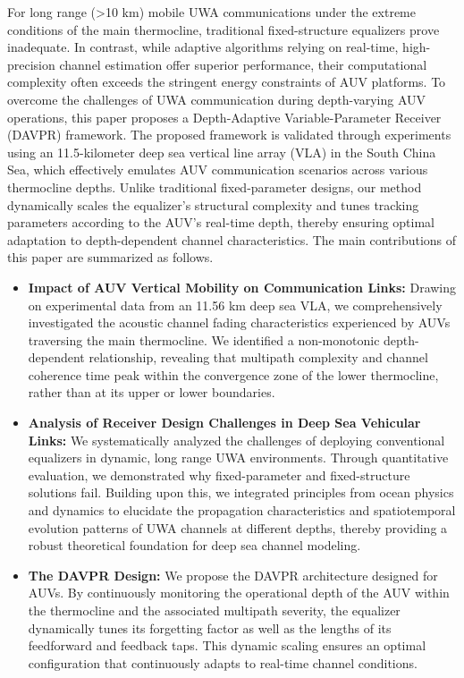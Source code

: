 \documentclass[lettersize,journal]{IEEEtran}
\begin{document}
For long range (\textgreater 10 km) mobile UWA communications under the extreme conditions of the main thermocline, traditional fixed-structure equalizers prove inadequate. In contrast, while adaptive algorithms relying on real-time, high-precision channel estimation offer superior performance, their computational complexity often exceeds the stringent energy constraints of AUV platforms. To overcome the challenges of UWA communication during depth-varying AUV operations, this paper proposes a Depth-Adaptive Variable-Parameter Receiver (DAVPR) framework. The proposed framework is validated through experiments using an 11.5-kilometer deep sea vertical line array (VLA) in the South China Sea, which effectively emulates AUV communication scenarios across various thermocline depths. Unlike traditional fixed-parameter designs, our method dynamically scales the equalizer's structural complexity and tunes tracking parameters according to the AUV’s real-time depth, thereby ensuring optimal adaptation to depth-dependent channel characteristics. The main contributions of this paper are summarized as follows.
\begin{itemize}
\item \textbf{Impact of AUV Vertical Mobility on Communication Links:} Drawing on experimental data from an 11.56 km deep sea VLA, we comprehensively investigated the acoustic channel fading characteristics experienced by AUVs traversing the main thermocline. We identified a non-monotonic depth-dependent relationship, revealing that multipath complexity and channel coherence time peak within the convergence zone of the lower thermocline, rather than at its upper or lower boundaries.
\item \textbf{Analysis of Receiver Design Challenges in Deep Sea Vehicular Links:} We systematically analyzed the challenges of deploying conventional equalizers in dynamic, long range UWA environments. Through quantitative evaluation, we demonstrated why fixed-parameter and fixed-structure solutions fail. Building upon this, we integrated principles from ocean physics and dynamics to elucidate the propagation characteristics and spatiotemporal evolution patterns of UWA channels at different depths, thereby providing a robust theoretical foundation for deep sea channel modeling.
\item \textbf{The DAVPR Design:} We propose the DAVPR architecture designed for AUVs. By continuously monitoring the operational depth of the AUV within the thermocline and the associated multipath severity, the equalizer dynamically tunes its forgetting factor as well as the lengths of its feedforward and feedback taps. This dynamic scaling ensures an optimal configuration that continuously adapts to real-time channel conditions.
\end{itemize}
\end{document}
